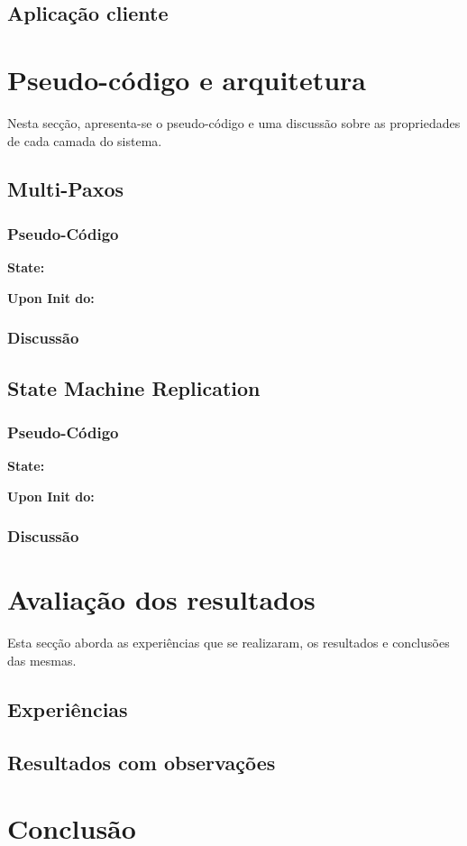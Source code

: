 \documentclass[12pt]{article}
\begin{document}
\newpage
\subsection{Aplicação cliente}


\newpage
\section{Pseudo-código e arquitetura}

Nesta secção, apresenta-se o pseudo-código e uma discussão sobre as propriedades de cada camada do sistema.

\subsection{Multi-Paxos}

\subsubsection{Pseudo-Código}


\bigbreak
\textbf{State:}

\bigbreak
\textbf{Upon Init do:}

\subsubsection{Discussão}


\newpage
\subsection{State Machine Replication}

\subsubsection{Pseudo-Código}

\bigbreak
\textbf{State:}


\bigbreak
\textbf{Upon Init do:}

\subsubsection{Discussão}

\newpage
\section{Avaliação dos resultados}

Esta secção aborda as experiências que se realizaram, os resultados e conclusões das mesmas.

\subsection{Experiências}


\subsection{Resultados com observações}


\newpage
\section{Conclusão}


\newpage
\begin{thebibliography}{00}

\end{thebibliography}
\end{document}
